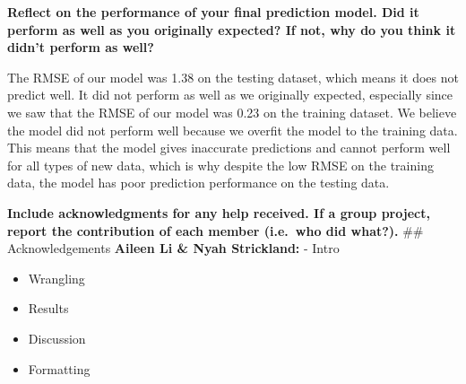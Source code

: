 \documentclass[
]{article}
\begin{document}
\textbf{Reflect on the performance of your final prediction model. Did
it perform as well as you originally expected? If not, why do you think
it didn't perform as well?}

The RMSE of our model was 1.38 on the testing dataset, which means it
does not predict well. It did not perform as well as we originally
expected, especially since we saw that the RMSE of our model was 0.23 on
the training dataset. We believe the model did not perform well because
we overfit the model to the training data. This means that the model
gives inaccurate predictions and cannot perform well for all types of
new data, which is why despite the low RMSE on the training data, the
model has poor prediction performance on the testing data.

\textbf{Include acknowledgments for any help received. If a group
project, report the contribution of each member (i.e.~who did what?).}
\#\# Acknowledgements \textbf{Aileen Li \& Nyah Strickland:} - Intro

\begin{itemize}
\item
  Wrangling
\item
  Results
\item
  Discussion
\item
  Formatting
\end{itemize}
\end{document}
